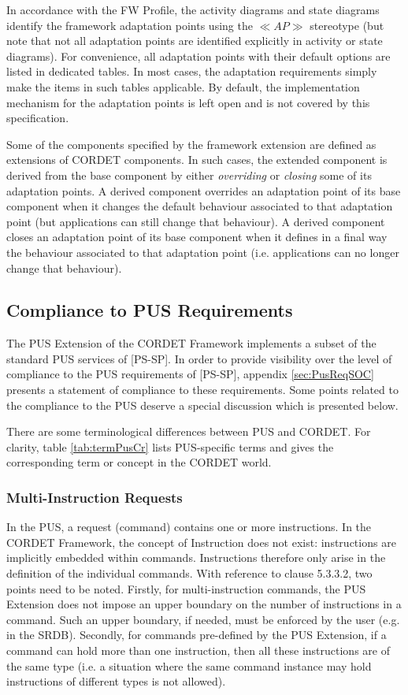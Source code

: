 \documentclass{pnp_article}
\begin{document}
In accordance with the FW Profile, the activity diagrams and state diagrams identify the framework adaptation points using the $\ll AP \gg$ stereotype (but note that not all adaptation points are identified explicitly in activity or state diagrams). 
For convenience, all adaptation points with their default options are listed in dedicated tables. 
In most cases, the adaptation requirements simply make the items in such tables applicable. By default, the implementation mechanism for the adaptation points is left open and is not covered by this specification. 

Some of the components specified by the framework extension are defined as extensions of CORDET components. In such cases, the extended component is derived from the base component by either \textit{overriding} or \textit{closing} some of its adaptation points. 
A derived component overrides an adaptation point of its base component when it changes the default behaviour associated to that adaptation point (but applications can still change that behaviour). 
A derived component closes an adaptation point of its base component when it defines in a final way the behaviour associated to that adaptation point (i.e. applications can no longer change that behaviour).

\subsection{Compliance to PUS Requirements}\label{sec:ComplianceToPus}
The PUS Extension of the CORDET Framework implements a subset of the standard PUS services of [PS-SP]. In order to provide visibility over the level of compliance to the PUS requirements of [PS-SP], appendix \ref{sec:PusReqSOC} presents a statement of compliance to these requirements. Some points related to the compliance to the PUS deserve a special discussion which is presented below. 

There are some terminological differences between PUS and CORDET. For clarity, table \ref{tab:termPusCr} lists PUS-specific terms and gives the corresponding term or concept in the CORDET world. 

\subsubsection{Multi-Instruction Requests}
In the PUS, a request (command) contains one or more instructions. In the CORDET Framework, the concept of Instruction does not exist: instructions are implicitly embedded within commands. Instructions therefore only arise in the definition of the individual commands. With reference to clause 5.3.3.2, two points need to be noted. Firstly, for multi-instruction commands, the PUS Extension does not impose an upper boundary on the number of instructions in a command. Such an upper boundary, if needed, must be enforced by the user (e.g. in the SRDB). Secondly, for commands pre-defined by the PUS Extension, if a command can hold more than one instruction, then all these instructions are of the same type (i.e. a situation where the same command instance may hold instructions of different types is not allowed). 
\end{document}
